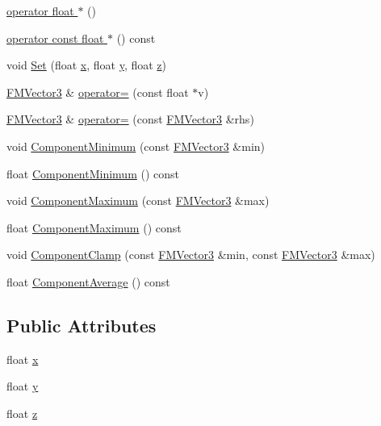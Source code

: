 \begin{DoxyCompactItemize}
\hyperlink{classFMVector3_a767d55b848c49e297cd683ca961fe138}{operator float $\ast$} ()
\item 
\hyperlink{classFMVector3_aa293da50dcc86b53884296e2ac8ca578}{operator const float $\ast$} () const 
\item 
void \hyperlink{classFMVector3_a9e59e251faad4951e50db8f04b7b8481}{Set} (float \hyperlink{classFMVector3_ab31613614892bba88807d31b2c9ee87e}{x}, float \hyperlink{classFMVector3_a6e8a45596a095d86205557d7231ef973}{y}, float \hyperlink{classFMVector3_ad912906661058ab718fb887ad67f5ad4}{z})
\item 
\hyperlink{classFMVector3}{FMVector3} \& \hyperlink{classFMVector3_a8b02f3c679758d31f1c5208c954cdbb9}{operator=} (const float $\ast$v)
\item 
\hyperlink{classFMVector3}{FMVector3} \& \hyperlink{classFMVector3_a4732a6439ff955252445b45b054ee0bb}{operator=} (const \hyperlink{classFMVector3}{FMVector3} \&rhs)
\item 
void \hyperlink{classFMVector3_a7ec4ab34895012f156add04613322c82}{ComponentMinimum} (const \hyperlink{classFMVector3}{FMVector3} \&min)
\item 
float \hyperlink{classFMVector3_a90460eb75019e378d47d7fbdbb754398}{ComponentMinimum} () const 
\item 
void \hyperlink{classFMVector3_a8682b0a239be2b72b85c3ff43b30d9e2}{ComponentMaximum} (const \hyperlink{classFMVector3}{FMVector3} \&max)
\item 
float \hyperlink{classFMVector3_a5f3b1065cb7615be6016be00ec6d5d49}{ComponentMaximum} () const 
\item 
void \hyperlink{classFMVector3_a0bbd056f588ca19bcaec3b4b92ff8351}{ComponentClamp} (const \hyperlink{classFMVector3}{FMVector3} \&min, const \hyperlink{classFMVector3}{FMVector3} \&max)
\item 
float \hyperlink{classFMVector3_a370f45ad1365232180b34d6eec7d3f0e}{ComponentAverage} () const 
\end{DoxyCompactItemize}
\subsection*{Public Attributes}
\begin{DoxyCompactItemize}
\item 
float \hyperlink{classFMVector3_ab31613614892bba88807d31b2c9ee87e}{x}
\item 
float \hyperlink{classFMVector3_a6e8a45596a095d86205557d7231ef973}{y}
\item 
float \hyperlink{classFMVector3_ad912906661058ab718fb887ad67f5ad4}{z}
\end{DoxyCompactItemize}
